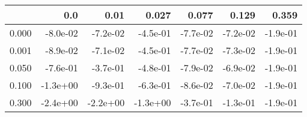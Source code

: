 \begin{tabular}{lrrrrrr}
\toprule
{} &      0.0 &     0.01 &    0.027 &    0.077 &    0.129 &    0.359 \\
\midrule
0.000 & -8.0e-02 & -7.2e-02 & -4.5e-01 & -7.7e-02 & -7.2e-02 & -1.9e-01 \\
0.001 & -8.9e-02 & -7.1e-02 & -4.5e-01 & -7.7e-02 & -7.3e-02 & -1.9e-01 \\
0.050 & -7.6e-01 & -3.7e-01 & -4.8e-01 & -7.9e-02 & -6.9e-02 & -1.9e-01 \\
0.100 & -1.3e+00 & -9.3e-01 & -6.3e-01 & -8.6e-02 & -7.0e-02 & -1.9e-01 \\
0.300 & -2.4e+00 & -2.2e+00 & -1.3e+00 & -3.7e-01 & -1.3e-01 & -1.9e-01 \\
\bottomrule
\end{tabular}
